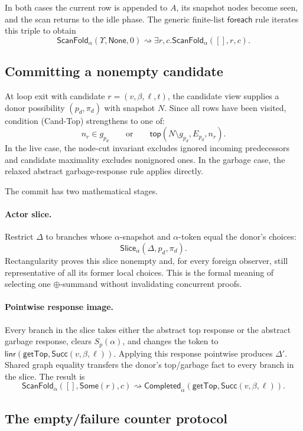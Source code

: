 \documentclass[11pt]{article}
\theoremstyle{definition}
\theoremstyle{remark}
\newcommand{\Linr}{\mathsf{linr}}
\newcommand{\GetTop}{\mathsf{getTop}}
\newcommand{\Succ}{\mathsf{Succ}}
\newcommand{\oplusset}{\mathbin{\oplus}}
\newcommand{\tran}{\mathrel{\rightsquigarrow}}
\begin{document}
In both cases the current row is appended to \(A\), its snapshot nodes become
seen, and the scan returns to the idle phase.  The generic finite-list
\(\mathsf{foreach}\) rule iterates this triple to obtain
\[
  \mathsf{ScanFold}_\alpha(\Upsilon,\mathsf{None},0)
  \tran \exists r,c.\mathsf{ScanFold}_\alpha([],r,c).
\]

\subsection{Committing a nonempty candidate}

At loop exit with candidate \(r=(v,\beta,\ell,t)\), the candidate view supplies
a donor possibility \((p_d,\pi_d)\) with snapshot \(N\).  Since all rows have
been visited, condition \textup{(Cand-Top)} strengthens to one of:
\[
  n_r\in g_{p_d}
  \qquad\text{or}\qquad
  \mathsf{top}(N\setminus g_{p_d},E_{p_d},n_r).
\]
In the live case, the node-cut invariant excludes ignored incoming
predecessors and candidate maximality excludes nonignored ones.  In the
garbage case, the relaxed abstract garbage-response rule applies directly.

The commit has two mathematical stages.

\paragraph{Actor slice.}
Restrict \(\Delta\) to branches whose \(\alpha\)-snapshot and \(\alpha\)-token
equal the donor's choices:
\[
  \mathsf{Slice}_\alpha(\Delta,p_d,\pi_d).
\]
Rectangularity proves this slice nonempty and, for every foreign observer,
still representative of all its former local choices.  This is the formal
meaning of selecting one \(\oplusset\)-summand without invalidating concurrent
proofs.

\paragraph{Pointwise response image.}
Every branch in the slice takes either the abstract top response or the
abstract garbage response, clears \(S_p(\alpha)\), and changes the token to
\(\Linr(\GetTop,\Succ(v,\beta,\ell))\).  Applying this response pointwise
produces \(\Delta'\).  Shared graph equality transfers the donor's top/garbage
fact to every branch in the slice.  The result is
\[
\mathsf{ScanFold}_\alpha([],\mathsf{Some}(r),c)
\tran
\mathsf{Completed}_\alpha(\GetTop,\Succ(v,\beta,\ell)).
\]

\subsection{The empty/failure counter protocol}
\end{document}
